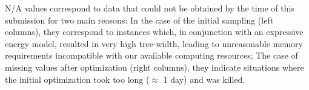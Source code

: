 \documentclass[10pt]{article}
\begin{document}
N/A values correspond to data that could not be obtained by the time of this submission for two main reasons: In the case of the initial sampling (left columns), they correspond to instances which, in conjunction with an expressive energy model, resulted in very high tree-width, leading to unreasonable memory requirements incompatible with our available computing resources; The case of missing values after optimization  (right columns), they indicate situations where the initial optimization took too long ($\approx$ 1 day) and was killed.




%
%
%
%
%
%
%

\end{document}
